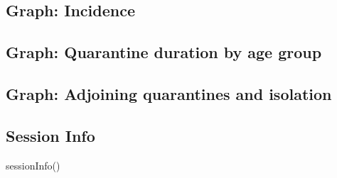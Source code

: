 \documentclass[
]{article}
\newenvironment{Shaded}{\begin{snugshade}}{\end{snugshade}}
\newcommand{\FunctionTok}[1]{\textcolor[rgb]{0.00,0.00,0.00}{#1}}
\newcommand{\NormalTok}[1]{#1}
\begin{document}
\hypertarget{graph-incidence}{%
\subsection{Graph: Incidence}\label{graph-incidence}}

\hypertarget{graph-quarantine-duration-by-age-group}{%
\subsection{Graph: Quarantine duration by age
group}\label{graph-quarantine-duration-by-age-group}}

\hypertarget{graph-adjoining-quarantines-and-isolation}{%
\subsection{Graph: Adjoining quarantines and
isolation}\label{graph-adjoining-quarantines-and-isolation}}

\hypertarget{session-info}{%
\subsection{Session Info}\label{session-info}}

\begin{Shaded}
\begin{Highlighting}[]
\FunctionTok{sessionInfo}\NormalTok{()}
\end{Highlighting}
\end{Shaded}
\end{document}
